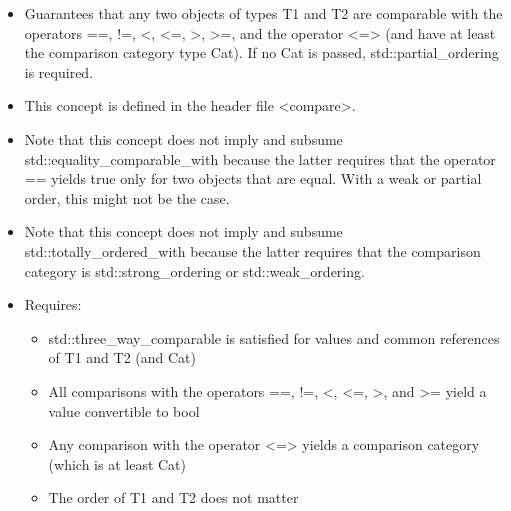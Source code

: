 \begin{itemize}
\item
Guarantees that any two objects of types T1 and T2 are comparable with the operators ==, !=, <, <=, >, >=, and the operator <=> (and have at least the comparison category type Cat). If no Cat is passed, std::partial\_ordering is required.

\item
This concept is defined in the header file <compare>.

\item
Note that this concept does not imply and subsume std::equality\_comparable\_with because the latter requires that the operator == yields true only for two objects that are equal. With a weak or partial order, this might not be the case.

\item
Note that this concept does not imply and subsume std::totally\_ordered\_with because the latter requires that the comparison category is std::strong\_ordering or std::weak\_ordering.

\item
Requires:
\begin{itemize}
\item
std::three\_way\_comparable is satisfied for values and common references of T1 and T2 (and Cat)

\item
All comparisons with the operators ==, !=, <, <=, >, and >= yield a value convertible to bool

\item
Any comparison with the operator <=> yields a comparison category (which is at least Cat)

\item
The order of T1 and T2 does not matter
\end{itemize}
\end{itemize}




